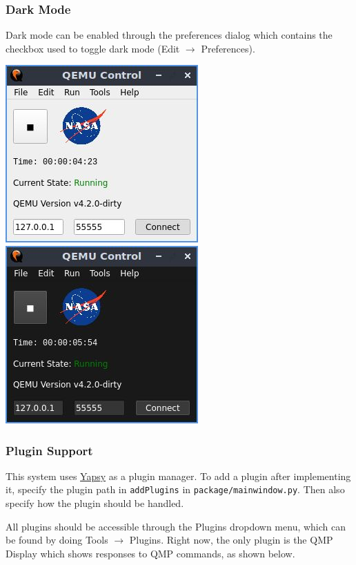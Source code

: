 \documentclass{article}
\newcommand{\code}[1]{\texttt{#1}}
\begin{document}
\subsubsection{Dark Mode}
Dark mode can be enabled through the preferences dialog which contains the checkbox used to toggle dark mode (Edit $\rightarrow$ Preferences).
\begin{center}
    \includegraphics[]{images/main_active.jpg}
    \includegraphics[]{images/main_active_dark.jpg}
\end{center}
\subsubsection{Plugin Support}
This system uses \href{https://yapsy.readthedocs.io/en/latest/}{Yapsy} as a plugin manager. To add a plugin after implementing it, specify the plugin path in \code{addPlugins} in \code{package/mainwindow.py}. Then also specify how the plugin should be handled.\par
All plugins should be accessible through the Plugins dropdown menu, which can be found by doing Tools $\rightarrow$ Plugins. Right now, the only plugin is the QMP Display which shows responses to QMP commands, as shown below.
\end{document}

